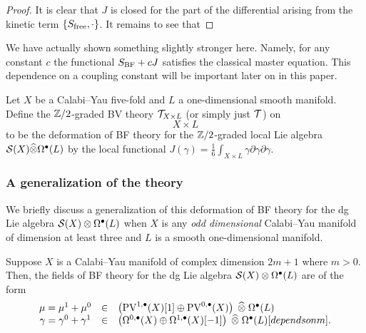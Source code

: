 \documentclass[11pt]{amsart}
\def\pv{{\rm PV}}
\begin{document}
\begin{proof}
It is clear that $J$ is closed for the part of the differential arising from the kinetic term $\{S_{\rm free},\cdot\}$.
It remains to see that
\end{proof}

\begin{rmk}
  We have actually shown something slightly stronger here.
  Namely, for any constant $c$ the functional $S_{\rm BF} + c J$ satisfies the classical master equation.
  This dependence on a coupling constant will be important later on in this paper.
\end{rmk}

\begin{dfn}\label{dfn:11dtheory}
Let $X$ be a Calabi--Yau five-fold and $L$ a one-dimensional smooth manifold.
Define the $\mathbb Z/2$-graded BV theory $\mathcal T_{X \times L}$ (or simply just $\mathcal T$) on
\[
  X \times L
\]
to be the deformation of BF theory for the $\mathbb Z/2$-graded local Lie algebra $\mathcal S(X) \widehat{\otimes} \Omega^{\bullet}(L)$ by the local functional $J (\gamma) = \frac16 \int_{X \times L} \gamma \partial \gamma \partial \gamma.$
\end{dfn}


\subsubsection{A generalization of the theory}

We briefly discuss a generalization of this deformation of BF theory for the dg Lie algebra $\mathcal S(X) \otimes \Omega^\bullet(L)$ when $X$ is any {\em odd dimensional} Calabi--Yau manifold of dimension at least three and $L$ is a smooth one-dimensional manifold.

Suppose $X$ is a Calabi--Yau manifold of complex dimension $2m+1$ where $m > 0$.
Then, the fields of BF theory for the dg Lie algebra $\mathcal S(X) \otimes \Omega^{\bullet}(L)$ are of the form
\[
  \begin{array}{ccl}
    \mu = \mu^1+\mu^0 & \in & \left(\pv^{1,\bu}(X)[1] \oplus \pv^{0,\bu}(X) \right) \; \Hat{\otimes} \; \Omega^{\bu}(L) \\
    \gamma = \gamma^0 + \gamma^1 & \in & \left(\Omega^{0,\bu}(X) \oplus \Omega^{1,\bu}(X)[-1] \right) \; \Hat{\otimes}\; \Omega^{\bu}(L)[depends on m] .
  \end{array}
\]
\end{document}
